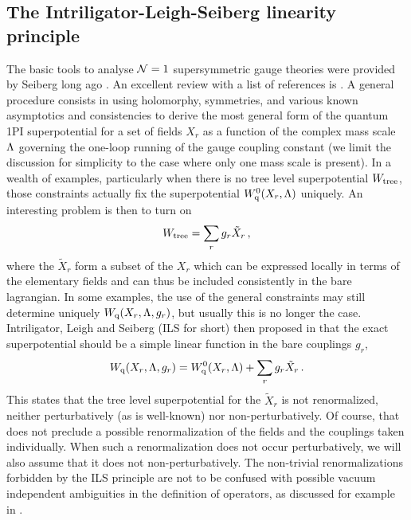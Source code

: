 \documentclass[a4paper,12pt]{article}
\def\wt{W_{\rm tree}}\def\weff{W_{\rm eff}}\def\ww{{\cal W}}
\begin{document}
%
\subsection{The Intriligator-Leigh-Seiberg linearity principle}
%

The basic tools to analyse ${\cal N}=1$ supersymmetric gauge theories
were provided by Seiberg long ago \cite{sei1}. An excellent review
with a list of references is \cite{revN1}. A general procedure
consists in using holomorphy, symmetries, and various known
asymptotics and consistencies to derive the most general form of the
quantum 1PI superpotential for a set of fields $X_{r}$ as a
function of the complex mass scale $\Lambda$ governing the one-loop running 
of the gauge coupling constant (we limit
the discussion for simplicity to the case where only one mass scale is
present). In a wealth of examples, particularly when there is no tree
level superpotential $\wt$, those constraints actually fix the
superpotential $W_{\rm q}^{0}(X_{r},\Lambda)$ uniquely. An interesting problem
is then to turn on
%
\begin{equation}
\label{suplin}
\wt = \sum_{r} g_{r} \tilde X_{r}\, ,
\end{equation}
%
where the $\tilde X_{r}$ form a subset of the $X_{r}$ which can be
expressed locally in terms of the elementary fields and can thus be
included consistently in the bare lagrangian. In some examples, the
use of the general constraints may still determine uniquely $W_{\rm q}
(X_{r},\Lambda,g_{r})$, but usually this is no longer the case.
Intriligator, Leigh and Seiberg (ILS for short) then proposed in
\cite{ILS} that the exact superpotential should be a simple linear
function in the bare couplings $g_{r}$,
%
\begin{equation}
\label{LP}
W_{\rm q} (X_{r}, \Lambda, g_{r}) = W_{\rm q}^{0}(X_{r},\Lambda) + \sum_{r} g_{r} \tilde
X_{r}\, .
\end{equation}
%
This states that the tree level superpotential for the $\tilde X_{r}$
is not renormalized, neither perturbatively (as is well-known) nor
non-perturbatively. Of course, that does not preclude a possible 
renormalization of the fields and the couplings taken individually. 
When such a renormalization does not occur perturbatively, we will 
also assume that it does not non-perturbatively.
The non-trivial renormalizations forbidden by the ILS principle are
not to be confused with possible vacuum independent ambiguities in the
definition of operators, as discussed for example in \cite{DH}.
\end{document}
